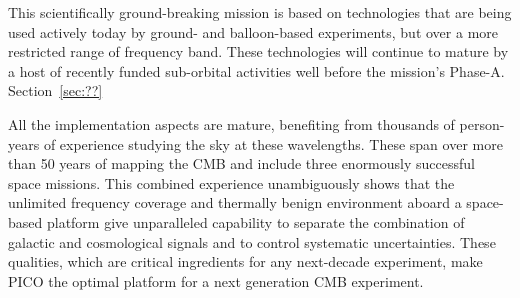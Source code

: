\documentclass[PICOReport.tex]{subfiles}
\begin{document}
This scientifically ground-breaking mission is based on technologies that are being used actively today by ground- and balloon-based experiments, but over a more restricted range of frequency band. These technologies will continue to mature by a host of recently funded sub-orbital activities well before the mission's Phase-A. Section~\ref{sec:??}

All the implementation aspects are mature, benefiting from thousands of person-years of experience studying the sky at these wavelengths. These span over more than 50 years of mapping the CMB and include three enormously successful space missions. This combined experience unambiguously shows that the unlimited frequency coverage and thermally benign environment aboard a space-based platform give unparalleled capability to separate the combination of galactic and cosmological signals and to control systematic uncertainties. These qualities, which are critical ingredients for any next-decade experiment, make PICO the optimal platform for a next generation CMB experiment.







\end{document}
